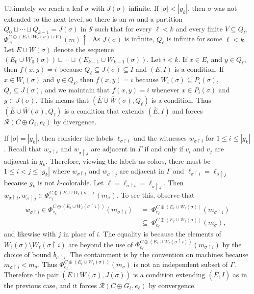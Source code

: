 \documentclass{article}
\def\R{\mathcal{R}}
\def\Sc{\mathcal{S}}
\newcommand{\uh}{\upharpoonright}
\newcommand{\diverge}{\!\!\uparrow}
\newcommand{\ol}[1]{\overline{#1}}
\numberwithin{theorem}{section}
\begin{document}
Ultimately we reach a leaf $\sigma$ with $J(\sigma)$ infinite.  If $|\sigma| < |g_k|$, then $\sigma$ was not extended to the next level, so there is an $m$ and a partition $Q_0 \sqcup \cdots \sqcup Q_{k-1} = J(\sigma)$ in $\Sc$ such that for every $\ell < k$ and every finite $V \subseteq Q_\ell$, $\Phi_{e_\ell}^{C \oplus (E_\ell \cup W_{\ell}(\sigma) \cup V)}(m)\diverge$.  As $J(\sigma)$ is infinite, $Q_\ell$ is infinite for some $\ell < k$.  Let $\ol{E} \cup \ol{W}(\sigma)$ denote the sequence $(E_0 \cup W_0(\sigma)) \sqcup \cdots \sqcup (E_{k-1} \cup W_{k-1}(\sigma))$.  Let $i < k$.  If $x \in E_i$ and $y \in Q_\ell$, then $f(x,y) = i$ because $Q_\ell \subseteq J(\sigma) \subseteq I$ and $(E, I)$ is a condition.  If $x \in W_i(\sigma)$ and $y \in Q_\ell$, then $f(x,y) = i$ because $W_i(\sigma) \subseteq P_i(\sigma)$, $Q_\ell \subseteq J(\sigma)$, and we maintain that $f(x, y) = i$ whenever $x \in P_i(\sigma)$ and $y \in J(\sigma)$.  This means that $(\ol{E} \cup \ol{W}(\sigma), Q_\ell)$ is a condition.  Thus $(\ol{E} \cup \ol{W}(\sigma), Q_\ell)$ is a condition that extends $(\ol{E}, I)$ and forces $\R(C \oplus G_\ell, e_\ell)$ by divergence.

If $|\sigma| = |g_k|$, then consider the labels $\ell_{\sigma \uh i}$ and the witnesses $w_{\sigma \uh i}$ for $1 \leq i \leq |g_k|$.  Recall that $w_{\sigma \uh i}$ and $w_{\sigma \uh j}$ are adjacent in $\Gamma$ if and only if $v_i$ and $v_j$ are adjacent in $g_k$.  Therefore, viewing the labels as colors, there must be $1 \leq i < j \leq |g_k|$ where $w_{\sigma \uh i}$ and $w_{\sigma \uh j}$ are adjacent in $\Gamma$ and $\ell_{\sigma \uh i} = \ell_{\sigma \uh j}$ because $g_k$ is not $k$-colorable.  Let $\ell = \ell_{\sigma \uh i} = \ell_{\sigma \uh j}$.  Then $w_{\sigma \uh i}, w_{\sigma \uh j} \in \Phi_{e_\ell}^{C \oplus (E_\ell \cup W_\ell(\sigma))}(m_\sigma)$.  To see this, observe that
\begin{align*}
w_{\sigma \uh i} \in \Phi_{e_\ell}^{C \oplus (E_\ell \cup W_\ell(\sigma \uh i))}(m_{\sigma \uh i}) &\;=\; \Phi_{e_\ell}^{C \oplus (E_\ell \cup W_\ell(\sigma))}(m_{\sigma \uh i})\\
&\;\subseteq\; \Phi_{e_\ell}^{C \oplus (E_\ell \cup W_\ell(\sigma))}(m_\sigma),
\end{align*}
and likewise with $j$ in place of $i$.  The equality is because the elements of $W_\ell(\sigma) \setminus W_\ell(\sigma \uh i)$ are beyond the use of $\Phi_{e_\ell}^{C \oplus (E_\ell \cup W_\ell(\sigma \uh i))}(m_{\sigma \uh i})$ by the choice of bound $b_{\sigma \uh i}$.  The containment is by the convention on machines because $m_{\sigma \uh i} < m_\sigma$.  Thus $\Phi_{e_\ell}^{C \oplus (E_\ell \cup W_\ell(\sigma))}(m_\sigma)$ is not an independent subset of $\Gamma$.  Therefore the pair $(\ol{E} \cup \ol{W}(\sigma), J(\sigma))$ is a condition extending $(\ol{E}, I)$ as in the previous case, and it forces $\R(C \oplus G_\ell, e_\ell)$ by convergence.
\end{document}
